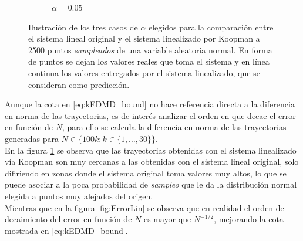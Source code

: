 \begin{figure}[htbp]
\begin{subfigure}[b]{0.32\textwidth}
        \caption{$\alpha=0.05$}
    \end{subfigure}
    \caption{Ilustración de los tres casos de $\alpha$ elegidos para la comparación entre el sistema lineal original y el sistema linealizado por Koopman a 2500 puntos \textit{sampleados} de una variable aleatoria normal. En forma de puntos se dejan los valores reales que toma el sistema y en línea continua los valores entregados por el sistema linealizado, que se consideran como predicción.}
    \label{fig:Comp_traj_lin}
\end{figure}
Aunque la cota en \eqref{eq:kEDMD_bound} no hace referencia directa a la diferencia en norma de las trayectorias, es de interés analizar el orden en que decae el error en función de $N$, para ello se calcula la diferencia en norma de las trayectorias generadas para $N \in \{ 100k : k \in \{1, \dots, 30\} \}$. \\
En la figura \ref{fig:Comp_traj_lin} se observa que las trayectorias obtenidas con el sistema linealizado vía Koopman son muy cercanas a las obtenidas con el sistema lineal original, solo difiriendo en zonas donde el sistema original toma valores muy altos, lo que se puede asociar a la poca probabilidad de \textit{sampleo} que le da la distribución normal elegida a puntos muy alejados del origen. \\
Mientras que en la figura \ref{fig:ErrorLin} se observa que en realidad el orden de decaimiento del error en función de $N$ es mayor que $N^{-1/2}$, mejorando la cota mostrada en \eqref{eq:kEDMD_bound}.
